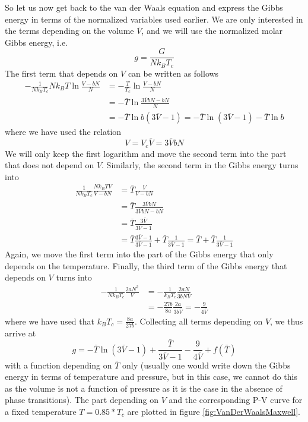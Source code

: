 \documentclass[a4paper, draft]{article}
\theoremstyle{own}
\theoremstyle{remark}
\begin{document}
So let us now get back to the van der Waals equation and express the Gibbs energy in terms of the normalized variables used earlier. We are only interested in the terms depending on the volume $\bar{V}$, and we will use the normalized molar Gibbs energy, i.e.
$$
g = \frac{G}{N k_B T_c}
$$
The first term that depends on $V$ can be written as follows
\begin{align*}
- \frac{1}{N k_B T_c} N k_B T  \ln\frac{V-bN}{N}  &= - \frac{T}{T_c}  \ln\frac{V-bN}{N} \\
&= - \bar{T} \ln\frac{3 \bar{V} b N - bN}{N} \\
&= - \bar{T} \ln b (3 \bar{V}   - 1) = - \bar{T} \ln  (3 \bar{V}   - 1) - \bar{T} \ln b
\end{align*}
where we have used the relation
$$
V = V_c \bar{V} = 3 \bar{V} b N
$$
We will only keep the first logarithm and move the second term into the part that does not depend on $V$. Similarly, the second term in the Gibbs energy turns into
\begin{align*}
\frac{1}{N k_B T_c}	\frac{N k_B TV}{V-bN} &= \bar{T} \frac{V}{V - bN} \\
&= \bar{T} \frac{3 \bar{V} b N}{3 \bar{V} b N - bN} \\
&= \bar{T} \frac{3 \bar{V} }{3 \bar{V} - 1} \\
&= \bar{T} \frac{3 \bar{V} - 1 }{3 \bar{V} - 1} + \bar{T} \frac{1 }{3 \bar{V} - 1} = \bar{T}  + \bar{T} \frac{1 }{3 \bar{V} - 1}
\end{align*}	
Again, we move the first term into the part of the Gibbs energy that only depends on the temperature. Finally, the third term of the Gibbs energy that depends on $V$ turns into
\begin{align*}
- \frac{1}{N k_B T_c} \frac{2aN^2}{V} &= - \frac{1}{k_B T_c} \frac{2aN}{3 b N \bar{V}} \\
&= - \frac{27b}{8a} \frac{2a}{3 b \bar{V}} = - \frac{9}{4 \bar{V}}
\end{align*}
where we have used that $k_B T_c =  \frac{8a}{27b}$. 
Collecting all terms depending on $V$, we thus arrive at
$$
g =  - \bar{T} \ln (3\bar{V} - 1) 
+  \frac{\bar{T}}{3\bar{V} - 1} - \frac{9}{4 \bar{V}} + f(\bar{T})
$$
with a function depending on $\bar{T}	$ only (usually one would write down the Gibbs energy in terms of temperature and pressure, but in this case, we cannot do this as the volume is not a function of pressure as it is the case in the absence of phase transitions). The part depending on $V$ and the corresponding P-V curve for a fixed temperature $T = 0.85*T_c$ are plotted in figure \ref{fig:VanDerWaalsMaxwell}.
\end{document}

